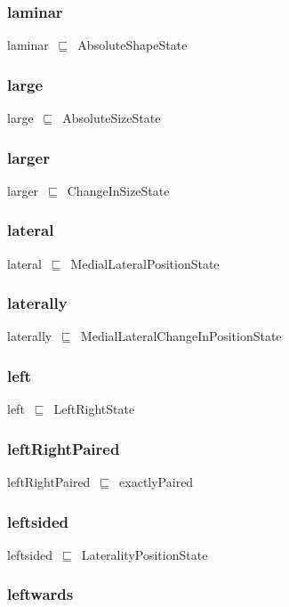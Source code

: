 \documentclass{article}
\begin{document}
\subsubsection*{laminar}

laminar~\ensuremath{\sqsubseteq}~AbsoluteShapeState~

\subsubsection*{large}

large~\ensuremath{\sqsubseteq}~AbsoluteSizeState~

\subsubsection*{larger}

larger~\ensuremath{\sqsubseteq}~ChangeInSizeState~

\subsubsection*{lateral}

lateral~\ensuremath{\sqsubseteq}~MedialLateralPositionState~

\subsubsection*{laterally}

laterally~\ensuremath{\sqsubseteq}~MedialLateralChangeInPositionState~

\subsubsection*{left}

left~\ensuremath{\sqsubseteq}~LeftRightState~

\subsubsection*{leftRightPaired}

leftRightPaired~\ensuremath{\sqsubseteq}~exactlyPaired~

\subsubsection*{leftsided}

leftsided~\ensuremath{\sqsubseteq}~LateralityPositionState~

\subsubsection*{leftwards}
\end{document}
